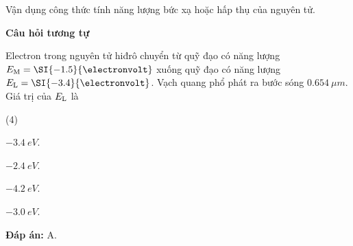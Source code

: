 \begin{dang}{Vận dụng công thức tính năng lượng bức xạ hoặc hấp thụ của nguyên tử.}
{	\begin{center}
		\textbf{Câu hỏi tương tự}
	\end{center}
	
	Electron trong nguyên tử hiđrô chuyển từ quỹ đạo có năng lượng $E_\text M = \SI{-1.5}{\electronvolt}$ xuống quỹ đạo có năng lượng $E_\text L = \SI{-3.4}{\electronvolt}$. Vạch quang phổ phát ra bước sóng $ \SI{0,654}{\mu m} $. Giá trị của $ E_\text L $ là
	\begin{mcq}(4)
		\item $ \SI{-3,4}{eV} $.
		\item $ \SI{-2,4}{eV} $.
		\item $ \SI{-4,2}{eV} $.
		\item $ \SI{-3,0}{eV} $.
	\end{mcq}
	
	\textbf{Đáp án:} A.
	}
\end{dang}
